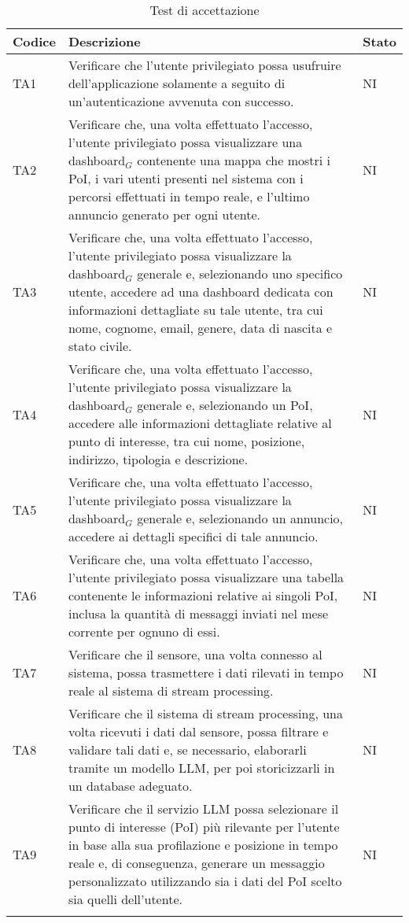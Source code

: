 \documentclass[10pt]{article}
\begin{document}
\begin{justify}
\begin{longtable}{|>{\centering\arraybackslash}m{2cm}|>{\centering\arraybackslash}m{7cm}|>{\centering\arraybackslash}m{2cm}|}
\hline
\textbf{Codice} & \textbf{Descrizione} & \textbf{Stato}\\
\endhead
\hline
TA1 & Verificare che l'utente privilegiato possa usufruire dell'applicazione solamente a seguito di un'autenticazione avvenuta con successo. & NI \\
\hline
TA2 & Verificare che, una volta effettuato l'accesso, l'utente privilegiato possa visualizzare una dashboard$_G$ contenente una mappa che mostri i PoI, i vari utenti presenti nel sistema con i percorsi effettuati in tempo reale, e l'ultimo annuncio generato per ogni utente. & NI \\
\hline
TA3 & Verificare che, una volta effettuato l'accesso, l'utente privilegiato possa visualizzare la dashboard$_G$ generale e, selezionando uno specifico utente, accedere ad una dashboard dedicata con informazioni dettagliate su tale utente, tra cui nome, cognome, email, genere, data di nascita e stato civile. & NI \\
\hline
TA4 & Verificare che, una volta effettuato l'accesso, l'utente privilegiato possa visualizzare la dashboard$_G$ generale e, selezionando un PoI, accedere alle informazioni dettagliate relative al punto di interesse, tra cui nome, posizione, indirizzo, tipologia e descrizione. & NI \\
\hline
TA5 & Verificare che, una volta effettuato l'accesso, l'utente privilegiato possa visualizzare la dashboard$_G$ generale e, selezionando un annuncio, accedere ai dettagli specifici di tale annuncio. & NI \\
\hline
TA6 & Verificare che, una volta effettuato l'accesso, l'utente privilegiato possa visualizzare una tabella contenente le informazioni relative ai singoli PoI, inclusa la quantità di messaggi inviati nel mese corrente per ognuno di essi. & NI \\
\hline
TA7 & Verificare che il sensore, una volta connesso al sistema, possa trasmettere i dati rilevati in tempo reale al sistema di stream processing. & NI \\
\hline
TA8 & Verificare che il sistema di stream processing, una volta ricevuti i dati dal sensore, possa filtrare e validare tali dati e, se necessario, elaborarli tramite un modello LLM, per poi storicizzarli in un database adeguato. & NI \\
\hline
TA9 & Verificare che il servizio LLM possa selezionare il punto di interesse (PoI) più rilevante per l'utente in base alla sua profilazione e posizione in tempo reale e, di conseguenza, generare un messaggio personalizzato utilizzando sia i dati del PoI scelto sia quelli dell'utente. & NI \\
\hline
\caption{Test di accettazione}\\
\end{longtable}



\end{justify}
\end{document}

